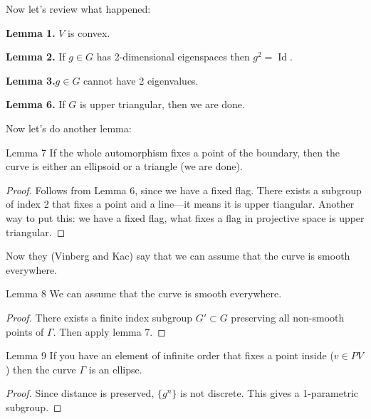 Now let's review what happened:

{\color{4}\bfseries Lemma 1.}\hspace{.5em} $V$ is convex.

{\color{7}\bfseries Lemma 2.}\hspace{.5em} If $g \in G$ has 2-dimensional eigenspaces then $g^2=\operatorname{Id}$.

{\color{6}\bfseries Lemma 3.}\hspace{.5em}$g \in G$ cannot have 2 eigenvalues.

{\color{5}\bfseries Lemma 6.}\hspace{.5em} If $G$ is upper triangular, then we are done.

Now let's do another lemma:

\begin{thing9}{Lemma 7}\leavevmode
	If the whole automorphism fixes a point of the boundary, then the curve is either an ellipsoid or a triangle (we are done).
\end{thing9}

\begin{proof}\leavevmode
	Follows from Lemma 6, since we have a fixed flag. There exists a subgroup of index 2 that fixes a point and a line---it means it is upper tiangular. Another way to put this: we have a fixed flag, what fixes a flag in projective space is upper triangular.
\end{proof}

Now they (Vinberg and Kac) say that we can assume that the curve is smooth everywhere.

\begin{thing6}{Lemma 8}\leavevmode
	We can assume that the curve is smooth everywhere.
\end{thing6}

\begin{proof}\leavevmode
	There exists a finite index subgroup $G'\subset G$ preserving all non-smooth points of $\Gamma$. Then apply lemma 7.
\end{proof}

\begin{thing2}{Lemma 9}\leavevmode
	If you have an element of infinite order that fixes a point inside ($v\in PV$) then the curve $\Gamma$ is an ellipse.
\end{thing2}

\begin{proof}\leavevmode
	Since distance is preserved, $\{g^n\}$ is not discrete. This gives a 1-parametric subgroup.
\end{proof}

